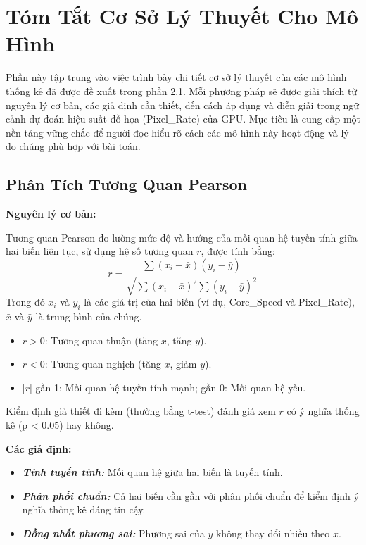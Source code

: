 \section{Tóm Tắt Cơ Sở Lý Thuyết Cho Mô Hình}

Phần này tập trung vào việc trình bày chi tiết cơ sở lý thuyết của các mô hình thống kê đã được đề xuất trong phần 2.1. Mỗi phương pháp sẽ được giải thích từ nguyên lý cơ bản, các giả định cần thiết, đến cách áp dụng và diễn giải trong ngữ cảnh dự đoán hiệu suất đồ họa (Pixel\_Rate) của GPU. Mục tiêu là cung cấp một nền tảng vững chắc để người đọc hiểu rõ cách các mô hình này hoạt động và lý do chúng phù hợp với bài toán.

\subsection{Phân Tích Tương Quan Pearson}

\textbf{Nguyên lý cơ bản:}

Tương quan Pearson đo lường mức độ và hướng của mối quan hệ tuyến tính giữa hai biến liên tục, sử dụng hệ số tương quan $r$, được tính bằng:
$$r = \frac{\sum (x_i - \bar{x})(y_i - \bar{y})}{\sqrt{\sum (x_i - \bar{x})^2 \sum (y_i - \bar{y})^2}}$$
Trong đó $x_i$ và $y_i$ là các giá trị của hai biến (ví dụ, Core\_Speed và Pixel\_Rate), $\bar{x}$ và $\bar{y}$ là trung bình của chúng.

\begin{itemize}
    \item $r > 0$: Tương quan thuận (tăng $x$, tăng $y$).
    \item $r < 0$: Tương quan nghịch (tăng $x$, giảm $y$).
    \item $|r|$ gần 1: Mối quan hệ tuyến tính mạnh; gần 0: Mối quan hệ yếu.
\end{itemize}

Kiểm định giả thiết đi kèm (thường bằng t-test) đánh giá xem $r$ có ý nghĩa thống kê (p < 0.05) hay không.

\textbf{Các giả định:}

\begin{itemize}
    \item \textbf{\textit{Tính tuyến tính:}} Mối quan hệ giữa hai biến là tuyến tính.
    \item \textbf{\textit{Phân phối chuẩn:}} Cả hai biến cần gần với phân phối chuẩn để kiểm định ý nghĩa thống kê đáng tin cậy.
    \item \textbf{\textit{Đồng nhất phương sai:}} Phương sai của $y$ không thay đổi nhiều theo $x$.
\end{itemize}


